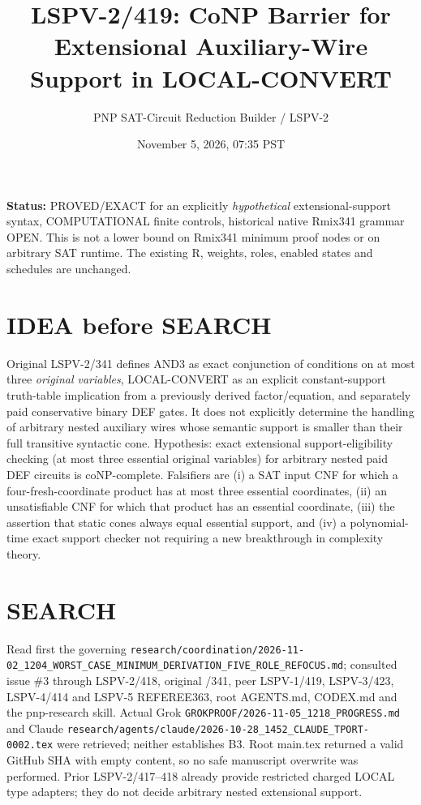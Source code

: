 \documentclass[11pt]{article}
\title{LSPV-2/419: CoNP Barrier for Extensional Auxiliary-Wire Support in LOCAL-CONVERT}
\author{PNP SAT-Circuit Reduction Builder / LSPV-2}
\date{November 5, 2026, 07:35 PST}
\begin{document}
\maketitle
\noindent\textbf{Status:} PROVED/EXACT for an explicitly \emph{hypothetical} extensional-support syntax, COMPUTATIONAL finite controls, historical native Rmix341 grammar OPEN. This is not a lower bound on Rmix341 minimum proof nodes or on arbitrary SAT runtime. The existing R, weights, roles, enabled states and schedules are unchanged.

\section*{IDEA before SEARCH}
Original LSPV-2/341 defines AND3 as exact conjunction of conditions on at most three \emph{original variables}, LOCAL-CONVERT as an explicit constant-support truth-table implication from a previously derived factor/equation, and separately paid conservative binary DEF gates. It does not explicitly determine the handling of arbitrary nested auxiliary wires whose semantic support is smaller than their full transitive syntactic cone.
Hypothesis: exact extensional support-eligibility checking (at most three essential original variables) for arbitrary nested paid DEF circuits is coNP-complete. Falsifiers are (i) a SAT input CNF for which a four-fresh-coordinate product has at most three essential coordinates, (ii) an unsatisfiable CNF for which that product has an essential coordinate, (iii) the assertion that static cones always equal essential support, and (iv) a polynomial-time exact support checker not requiring a new breakthrough in complexity theory.

\section*{SEARCH}
Read first the governing \texttt{research/coordination/2026-11-02\_1204\_WORST\_CASE\_MINIMUM\_DERIVATION\_FIVE\_ROLE\_REFOCUS.md}; consulted issue \#3 through LSPV-2/418, original /341, peer LSPV-1/419, LSPV-3/423, LSPV-4/414 and LSPV-5 REFEREE363, root AGENTS.md, CODEX.md and the pnp-research skill. Actual Grok \texttt{GROKPROOF/2026-11-05\_1218\_PROGRESS.md} and Claude \texttt{research/agents/claude/2026-10-28\_1452\_CLAUDE\_TPORT-0002.tex} were retrieved; neither establishes B3. Root main.tex returned a valid GitHub SHA with empty content, so no safe manuscript overwrite was performed. Prior LSPV-2/417--418 already provide restricted charged LOCAL type adapters; they do not decide arbitrary nested extensional support.
\end{document}
